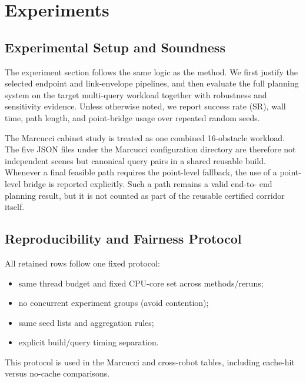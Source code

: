 \documentclass[journal]{IEEEtran}
\begin{document}
\section{Experiments}\label{sec:exp}

\subsection{Experimental Setup and Soundness}\label{sec:exp_setup_sound}

The experiment section follows the same logic as the method. We first justify
the selected endpoint and link-envelope pipelines, and then evaluate the full
planning system on the target multi-query workload together with robustness and
sensitivity evidence. Unless otherwise noted, we report success rate (SR), wall
time, path length, and point-bridge usage over repeated random seeds.

The Marcucci cabinet study is treated as one combined 16-obstacle workload.
The five JSON files under the Marcucci configuration directory are therefore
not independent scenes but canonical query pairs in a shared reusable build.
Whenever a final feasible path requires the point-level fallback, the use of a
point-level bridge is reported explicitly. Such a path remains a valid end-to-
end planning result, but it is not counted as part of the reusable certified
corridor itself.

\subsection{Reproducibility and Fairness Protocol}
\label{sec:exp_repro}

All retained rows follow one fixed protocol:
\begin{itemize}[nosep]
  \item same thread budget and fixed CPU-core set across methods/reruns;
  \item no concurrent experiment groups (avoid contention);
  \item same seed lists and aggregation rules;
  \item explicit build/query timing separation.
\end{itemize}
This protocol is used in the Marcucci and cross-robot tables, including
cache-hit versus no-cache comparisons.

\end{document}
